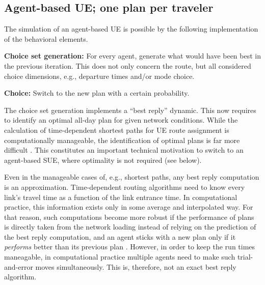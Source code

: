 \subsection{Agent-based UE; one plan per traveler}
\label{sec:agent-based-ue}

The simulation of an agent-based UE is possible by the following 
implementation of the behavioral elements.

%
%
%
%

\textbf{Choice set generation:} For every agent,
  generate what would have been best in the previous iteration.
  This does not only concern the route,
  but all considered choice dimensions, e.g., departure times and/or
  mode choice. 

\textbf{Choice:} Switch to the new plan with a
  certain probability.

The choice set generation implements a ``best reply'' dynamic. This now requires to identify an optimal all-day plan for given network conditions. While the calculation of time-dependent shortest paths for UE route assignment is computationally manageable, the identification of optimal plans is far more difficult \citep[][]{recker-2001}. 
This constitutes an important technical motivation to switch to an agent-based SUE, where optimality is not required (see below).

Even in the manageable cases of, e.g., shortest paths, 
any best reply computation is an approximation.  
Time-dependent routing algorithms need to know every link's travel
time as a function of the link entrance time.  In computational
practice, this information exists only in some average and
interpolated way.  For that reason, such computations become more
robust if the performance of plans is directly taken from the network
loading instead of relying on the prediction of the best reply
computation, and an agent sticks with a new plan only if it
\emph{performs} better than its previous plan
\citep{RaneyNagel2004agdb}.  However, in order to keep the run times
maneagable, in computational practice multiple agents need to make
such trial-and-error moves simultaneously.  This is, therefore, not an
exact best reply algorithm.


